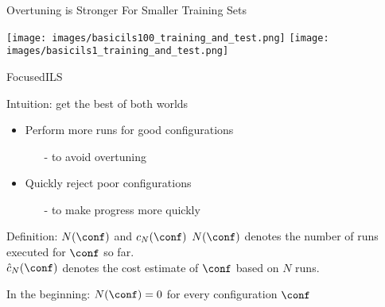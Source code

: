 \begin{frame}[fragile]{Overtuning is Stronger For Smaller Training Sets}

\begin{center}
\texttt{[image: images/basicils100\_training\_and\_test.png]}
\texttt{[image: images/basicils1\_training\_and\_test.png]}
\end{center}

\end{frame}




\begin{frame}[c,fragile]{FocusedILS}

Intuition: get the best of both worlds
\begin{itemize}
\item Perform more runs for good configurations
\begin{itemize}
\item[-] to avoid overtuning
\end{itemize}
\item Quickly reject poor configurations
\begin{itemize}
\item[-] to make progress more quickly
\end{itemize}
\end{itemize}

\pause

\begin{block}{Definition: $N(\conf)$ and $c_N(\conf)$}
\alert{$N(\conf)$} denotes the number of runs executed for $\conf$ so far.\\
\alert{$\hat{c}_N(\conf)$} denotes the cost estimate of $\conf$ based on $N$ runs.
\end{block}

\pause
In the beginning: $N(\conf)=0$ for every configuration $\conf$

\end{frame}




